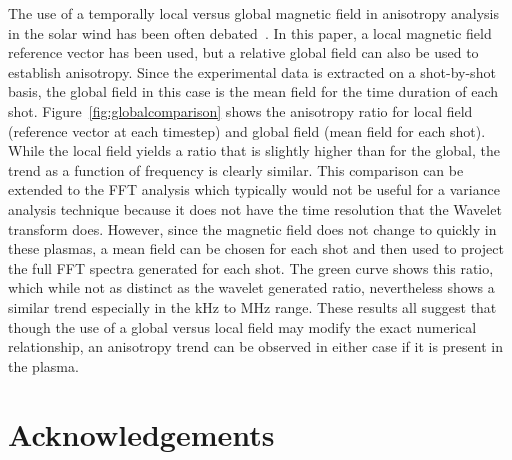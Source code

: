 \documentclass[aip,prl,amsmath,amssymb,reprint,superscriptaddress]{revtex4-1} %
\begin{document}
The use of a temporally local versus global magnetic field in anisotropy analysis in the solar wind has been often debated~\cite{podesta09,matthaeus12}. In this paper, a local magnetic field reference vector has been used, but a relative global field can also be used to establish anisotropy. Since the experimental data is extracted on a shot-by-shot basis, the global field in this case is the mean field for the time duration of each shot. Figure~\ref{fig:globalcomparison} shows the anisotropy ratio for local field (reference vector at each timestep) and global field (mean field for each shot). While the local field yields a ratio that is slightly higher than for the global, the trend as a function of frequency is clearly similar. This comparison can be extended to the FFT analysis which typically would not be useful for a variance analysis technique because it does not have the time resolution that the Wavelet transform does. However, since the magnetic field does not change to quickly in these plasmas, a mean field can be chosen for each shot and then used to project the full FFT spectra generated for each shot. The green curve shows this ratio, which while not as distinct as the wavelet generated ratio, nevertheless shows a similar trend especially in the kHz to MHz range. These results all suggest that though the use of a global versus local field may modify the exact numerical relationship, an anisotropy trend can be observed in either case if it is present in the plasma.
\section*{Acknowledgements}
\end{document}
